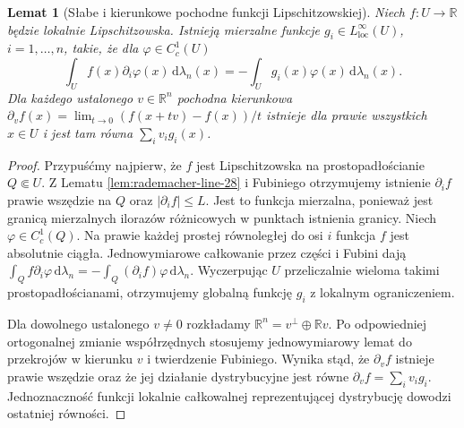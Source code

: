 \documentclass[11pt,a4paper,oneside]{book}
\numberwithin{equation}{chapter}
\theoremstyle{plain}
\newtheorem{lemat}[twierdzenie]{Lemat}
\theoremstyle{definition}
\theoremstyle{remark}
\begin{document}
\begin{lemat}[Słabe i kierunkowe pochodne funkcji Lipschitzowskiej]
\label{lem:rademacher-direction-28}
Niech $f:U\to\mathbb R$ będzie lokalnie Lipschitzowska.
Istnieją mierzalne funkcje $g_i\in L^\infty_{\mathrm{loc}}(U)$,
$i=1,\ldots,n$, takie, że dla $\varphi\in C_c^1(U)$
\[
 \int_U f(x)\partial_i\varphi(x)\,\mathrm d\lambda_n(x)
 =-\int_U g_i(x)\varphi(x)\,\mathrm d\lambda_n(x).
\]
Dla każdego ustalonego $v\in\mathbb R^n$ pochodna
kierunkowa $\partial_v f(x)=\lim_{t\to0}
(f(x+tv)-f(x))/t$ istnieje dla prawie wszystkich
$x\in U$ i jest tam równa $\sum_i v_i g_i(x)$.
\end{lemat}
\begin{proof}
Przypuśćmy najpierw, że $f$ jest Lipschitzowska na
prostopadłościanie $Q\Subset U$. Z Lematu
\ref{lem:rademacher-line-28} i Fubiniego otrzymujemy
istnienie $\partial_i f$ prawie wszędzie na $Q$ oraz
$|\partial_i f|\le L$. Jest to funkcja mierzalna,
ponieważ jest granicą mierzalnych ilorazów różnicowych
w punktach istnienia granicy. Niech $\varphi\in C_c^1(Q)$.
Na prawie każdej prostej równoległej do osi $i$ funkcja
$f$ jest absolutnie ciągła. Jednowymiarowe całkowanie
przez części i Fubini dają
$\int_Q f\partial_i\varphi\,\mathrm d\lambda_n
=-\int_Q (\partial_i f)\varphi\,\mathrm d\lambda_n$.
Wyczerpując $U$ przeliczalnie wieloma takimi
prostopadłościanami, otrzymujemy globalną funkcję
$g_i$ z lokalnym ograniczeniem.

Dla dowolnego ustalonego $v\ne0$ rozkładamy
$\mathbb R^n=v^\perp\oplus\mathbb Rv$.
Po odpowiedniej ortogonalnej zmianie współrzędnych
stosujemy jednowymiarowy lemat do przekrojów
w kierunku $v$ i twierdzenie Fubiniego.
Wynika stąd, że $\partial_v f$ istnieje prawie
wszędzie oraz że jej działanie dystrybucyjne jest
równe $\partial_v f=\sum_i v_i g_i$.
Jednoznaczność funkcji lokalnie całkowalnej
reprezentującej dystrybucję dowodzi ostatniej równości.
\end{proof}
\end{document}
